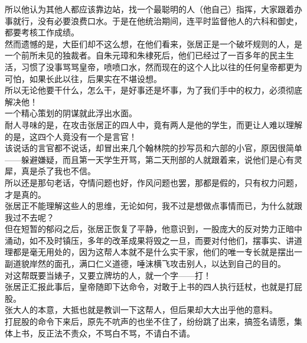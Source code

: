 \begin{multicols}{\theparacolNo}
所以他认为其他人都应该靠边站，找一个最聪明的人（他自己）指挥，大家跟着办事就行，没有必要浪费口水。于是在他统治期间，连平时监督他人的六科和御史，都要考核工作成绩。\\

然而遗憾的是，大臣们却不这么想，在他们看来，张居正是一个破坏规则的人，是一个前所未见的独裁者。自朱元璋和朱棣死后，他们已经过了一百多年的民主生活，习惯了没事骂骂皇帝，喷喷口水，然而现在的这个人比以往的任何皇帝都更为可怕，如果长此以往，后果实在不堪设想。\\

所以无论他要干什么，怎么干，是好事还是坏事，为了我们手中的权力，必须彻底解决他！\\

一个精心策划的阴谋就此浮出水面。\\

耐人寻味的是，在攻击张居正的四人中，竟有两人是他的学生，而更让人难以理解的是，这四个人竟没有一个是言官！\\

该说话的言官都不说话，却冒出来几个翰林院的抄写员和六部的小官，原因很简单——躲避嫌疑，而且第一天学生开骂，第二天刑部的人就跟着来，说他们是心有灵犀，真是杀了我也不信。\\

所以还是那句老话，夺情问题也好，作风问题也罢，那都是假的，只有权力问题，才是真的。\\

张居正不能理解这些人的思维，无论如何，我不过是想做点事情而已，为什么就跟我过不去呢？\\

但在短暂的郁闷之后，张居正恢复了平静，他意识到，一股庞大的反对势力正暗中涌动，如不及时镇压，多年的改革成果将毁之一旦，而要对付他们，摆事实、讲道理都是毫无用处的，因为这帮人本就不是什么实干家，他们的唯一专长就是摆出一副道貌岸然的面孔，满口仁义道德，唾沫横飞攻击别人，以达到自己的目的。\\

对这帮既要当婊子，又要立牌坊的人，就一个字——打！\\

张居正汇报此事后，皇帝随即下达命令，对敢于上书的四人执行廷杖，也就是打屁股。\\

张大人的本意，大抵也就是教训一下这帮人，但后果却大大出乎他的意料。\\

打屁股的命令下来后，原先不吭声的也坐不住了，纷纷跳了出来，搞签名请愿，集体上书，反正法不责众，不骂白不骂，不请白不请。\\


\end{multicols}
